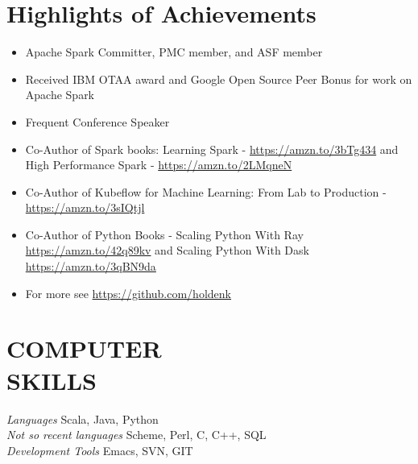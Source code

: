 \documentclass[10pt,line,margin=0.1]{newsres}
\begin{document}
\address{San Francisco, CA, USA}
\address{E-mail: holden@pigscanfly.ca, Cell: (425) 233-8271}
 
\begin{resume}
\section{Highlights of Achievements}
  \begin{itemize}  \itemsep -2pt %
  \item{Apache Spark Committer, PMC member, and ASF member}
  \item{Received IBM OTAA award and Google Open Source Peer Bonus for work on Apache Spark}
  \item{Frequent Conference Speaker}
  \item{Co-Author of Spark books: Learning Spark - \url{https://amzn.to/3bTg434} and High Performance Spark - \url{https://amzn.to/2LMqneN}}
  \item{Co-Author of Kubeflow for Machine Learning: From Lab to Production  - \url{https://amzn.to/3sIQtjl}}
  \item{Co-Author of Python Books  - Scaling Python With Ray \url{https://amzn.to/42q89kv} and Scaling Python With Dask \url{https://amzn.to/3qBN9da}}
  \item{For more see \url{https://github.com/holdenk}}
\end{itemize}
  \section{COMPUTER \\ SKILLS} {\sl Languages} Scala, Java, Python \\
                {\sl Not so recent languages} Scheme, Perl, C, C++, SQL \\
                {\sl Development Tools} Emacs, SVN, GIT \\
 

\end{resume}
\end{document}
